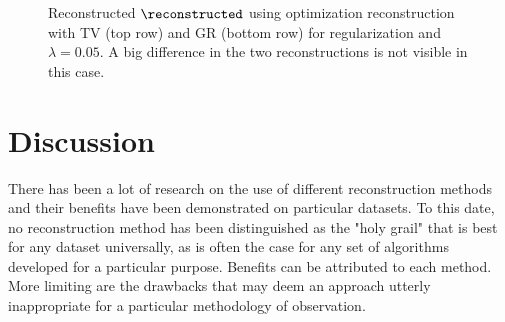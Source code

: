 %
\begin{figure}
    \caption{Reconstructed \(\reconstructed\) using optimization reconstruction with \ac{TV} (top row) and \ac{GR}
        (bottom row) for regularization and \(\lambda = 0.05\).
        A big difference in the two reconstructions is not visible in this case.}  %
\end{figure}
%



\begin{marginfigure}[*-17]
    \caption{Comparison of the two reconstructions using \ac{GR} and \ac{TV} for regularization (\(\lambda = 0.05\)) on
    a cut-out of the image. It is important to note that \(\lambda\) does not have the same effect for one value on any
    regularization.}
\end{marginfigure}

\section{Discussion}%

There has been a lot of research on the use of different reconstruction methods and their benefits have been
    demonstrated on particular datasets.
To this date, no reconstruction method has been distinguished as the "holy grail" that is best for any dataset
    universally, as is often the case for any set of algorithms developed for a particular purpose.
Benefits can be attributed to each method.
More limiting are the drawbacks that may deem an approach utterly inappropriate for a particular methodology of 
    observation.


